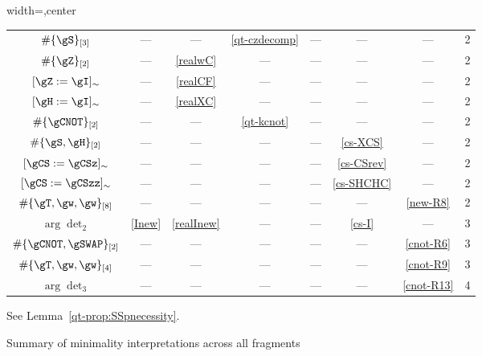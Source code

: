 \documentclass[10pt,a4paper]{article}
\def\cref#1{Lemma~\ref{#1}}%
\begin{document}
\begin{figure}[ht]
\begin{threeparttable}
\begin{adjustbox}{width=\textwidth,center}
\begin{tabular}{|c|c|c|c|c|c|c|c|}
    $\#\{\gS\}_{[3]}$ & — & — & \eqref{qt-czdecomp} & — & — & — & 2 \\
    $\#\{\gZ\}_{[2]}$ & — & \eqref{realwC} & — & — & — & — & 2 \\
    $[\gZ:=\gI]_{\sim}$ & — & \eqref{realCF} & — & — & — & — & 2 \\
    $[\gH:=\gI]_{\sim}$ & — & \eqref{realXC} & — & — & — & — & 2 \\
    $\#\{\gCNOT\}_{[2]}$ & — & — & \eqref{qt-kcnot} & — & — & — & 2 \\
    $\#\{\gS,\gH\}_{[2]}$ & — & — & — & — & \eqref{cs-XCS} & — & 2 \\
    $[\gCS:=\gCSz]_{\sim}$ & — & — & — & — & \eqref{cs-CSrev} & — & 2 \\
    $[\gCS:=\gCSzz]_{\sim}$ & — & — & — & — & \eqref{cs-SHCHC} & — & 2 \\
    $\#\{\gT,\gw,\gw\}_{[8]}$ & — & — & — & — & — & \eqref{new-R8} & 2 \\
    \hline
    $\arg\det_{2}$ & \eqref{Inew} & \eqref{realInew} & — & — & \eqref{cs-I} & — & 3 \\
    $\#\{\gCNOT,\gSWAP\}_{[2]}$ & — & —  & — & — & — & \eqref{cnot-R6} & 3 \\
    $\#\{\gT,\gw,\gw\}_{[4]}$ & — & — & — & — & — & \eqref{cnot-R9} & 3 \\
    \hline
    $\arg\det_{3}$ & — & — & — & — & — & \eqref{cnot-R13} & 4 \\
    \hline
    \end{tabular}
    \end{adjustbox}
    \begin{tablenotes}
    \footnotesize
    \item[a] See \cref{qt-prop:SSpnecessity}.
    \end{tablenotes}
    \end{threeparttable}
  \caption{Summary of minimality interpretations across all fragments}
  \label{fig:minimality-summary}
\end{figure}

\end{document}
